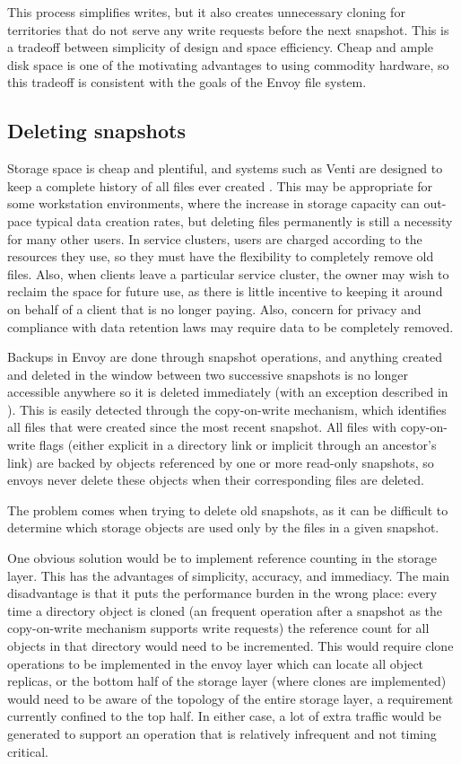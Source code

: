 This process simplifies writes, but it also creates unnecessary cloning for territories that do not serve any write requests before the next snapshot. This is a tradeoff between simplicity of design and space efficiency. Cheap and ample disk space is one of the motivating advantages to using commodity hardware, so this tradeoff is consistent with the goals of the Envoy file system.

\subsection{Deleting snapshots}

Storage space is cheap and plentiful, and systems such as Venti are designed to keep a complete history of all files ever created \cite{quinlan}. This may be appropriate for some workstation environments, where the increase in storage capacity can out-pace typical data creation rates, but deleting files permanently is still a necessity for many other users. In service clusters, users are charged according to the resources they use, so they must have the flexibility to completely remove old files. Also, when clients leave a particular service cluster, the owner may wish to reclaim the space for future use, as there is little incentive to keeping it around on behalf of a client that is no longer paying. Also, concern for privacy and compliance with data retention laws may require data to be completely removed.

Backups in Envoy are done through snapshot operations, and anything created and deleted in the window between two successive snapshots is no longer accessible anywhere so it is deleted immediately (with an exception described in ). This is easily detected through the copy-on-write mechanism, which identifies all files that were created since the most recent snapshot. All files with copy-on-write flags (either explicit in a directory link or implicit through an ancestor's link) are backed by objects referenced by one or more read-only snapshots, so envoys never delete these objects when their corresponding files are deleted.

The problem comes when trying to delete old snapshots, as it can be difficult to determine which storage objects are used only by the files in a given snapshot.

One obvious solution would be to implement reference counting in the storage layer. This has the advantages of simplicity, accuracy, and immediacy. The main disadvantage is that it puts the performance burden in the wrong place: every time a directory object is cloned (an frequent operation after a snapshot as the copy-on-write mechanism supports write requests) the reference count for all objects in that directory would need to be incremented. This would require clone operations to be implemented in the envoy layer which can locate all object replicas, or the bottom half of the storage layer (where clones are implemented) would need to be aware of the topology of the entire storage layer, a requirement currently confined to the top half. In either case, a lot of extra traffic would be generated to support an operation that is relatively infrequent and not timing critical.

